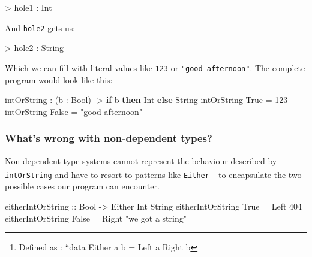 \documentclass[
]{article}
\newenvironment{Shaded}{}{}
\newcommand{\DataTypeTok}[1]{\textcolor[rgb]{0.56,0.13,0.00}{#1}}
\newcommand{\DecValTok}[1]{\textcolor[rgb]{0.25,0.63,0.44}{#1}}
\newcommand{\KeywordTok}[1]{\textcolor[rgb]{0.00,0.44,0.13}{\textbf{#1}}}
\newcommand{\NormalTok}[1]{#1}
\newcommand{\OperatorTok}[1]{\textcolor[rgb]{0.40,0.40,0.40}{#1}}
\newcommand{\OtherTok}[1]{\textcolor[rgb]{0.00,0.44,0.13}{#1}}
\newcommand{\StringTok}[1]{\textcolor[rgb]{0.25,0.44,0.63}{#1}}
\begin{document}
\begin{Shaded}
\begin{Highlighting}[]
\OperatorTok{\textgreater{}}\NormalTok{ hole1 }\OperatorTok{:} \DataTypeTok{Int}
\end{Highlighting}
\end{Shaded}

And \texttt{hole2} gets us:

\begin{Shaded}
\begin{Highlighting}[]
\OperatorTok{\textgreater{}}\NormalTok{ hole2 }\OperatorTok{:} \DataTypeTok{String}
\end{Highlighting}
\end{Shaded}

Which we can fill with literal values like \texttt{123} or
\texttt{"good\ afternoon"}. The complete program would look like this:

\begin{Shaded}
\begin{Highlighting}[]
\NormalTok{intOrString }\OperatorTok{:}\NormalTok{ (b }\OperatorTok{:} \DataTypeTok{Bool}\NormalTok{) }\OtherTok{{-}\textgreater{}} \KeywordTok{if}\NormalTok{ b }\KeywordTok{then} \DataTypeTok{Int} \KeywordTok{else} \DataTypeTok{String}
\NormalTok{intOrString }\DataTypeTok{True} \OtherTok{=} \DecValTok{123}
\NormalTok{intOrString }\DataTypeTok{False} \OtherTok{=} \StringTok{"good afternoon"}
\end{Highlighting}
\end{Shaded}

\hypertarget{whats-wrong-with-non-dependent-types}{%
\subsubsection{What's wrong with non-dependent
types?}\label{whats-wrong-with-non-dependent-types}}

Non-dependent type systems cannot represent the behaviour described by
\texttt{intOrString} and have to resort to patterns like \texttt{Either}
\footnote{Defined as : ``data Either a b = Left a \textbar{} Right b} to
encapsulate the two possible cases our program can encounter.

\begin{Shaded}
\begin{Highlighting}[]
\OtherTok{eitherIntOrString ::} \DataTypeTok{Bool} \OtherTok{{-}\textgreater{}} \DataTypeTok{Either} \DataTypeTok{Int} \DataTypeTok{String}
\NormalTok{eitherIntOrString }\DataTypeTok{True} \OtherTok{=} \DataTypeTok{Left} \DecValTok{404}
\NormalTok{eitherIntOrString }\DataTypeTok{False} \OtherTok{=} \DataTypeTok{Right} \StringTok{"we got a string"}
\end{Highlighting}
\end{Shaded}
\end{document}
